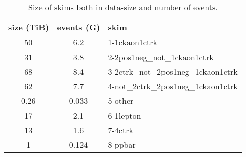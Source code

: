\begin{table}[htpb]
\begin{center}

\begin{minipage}{0.8\textwidth}

\caption{\label{tab:skimsize}Size of skims both in data-size and number of events.}
\begin{center}
\begin{tabular}{ccl}

\hline \hline

size (TiB) & events (G) & skim \\

\hline

50 & 6.2 & 1-1ckaon1ctrk \\
31 & 3.8 & 2-2pos1neg\_not\_1ckaon1ctrk \\
68 & 8.4 & 3-2ctrk\_not\_2pos1neg\_1ckaon1ctrk \\
62 & 7.7 & 4-not\_2ctrk\_2pos1neg\_1ckaon1ctrk \\
0.26 & 0.033 & 5-other \\

\hline

17 & 2.1 & 6-1lepton \\
13 & 1.6 & 7-4ctrk \\
1 & 0.124 & 8-ppbar \\

\hline \hline

\end{tabular}
\end{center}

\end{minipage}

\end{center}
\end{table}
